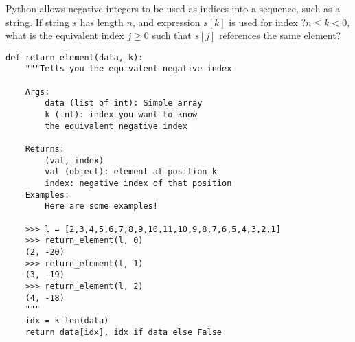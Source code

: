  \label{sssec:ex1_8}

Python allows negative integers to be used as indices into a sequence, such as a string. If string $s$ has length $n$, and expression $s[k]$ is used for index $?n\leq k<0$, what is the equivalent index $j\geq 0$ such that $s[j]$ references the same element?

\begin{lstlisting}[title=Exercise R-1.8]
def return_element(data, k):
    """Tells you the equivalent negative index

    Args:
        data (list of int): Simple array
        k (int): index you want to know
        the equivalent negative index

    Returns:
        (val, index)
        val (object): element at position k
        index: negative index of that position
    Examples:
        Here are some examples!

    >>> l = [2,3,4,5,6,7,8,9,10,11,10,9,8,7,6,5,4,3,2,1]
    >>> return_element(l, 0)
    (2, -20)
    >>> return_element(l, 1)
    (3, -19)
    >>> return_element(l, 2)
    (4, -18)
    """
    idx = k-len(data)
    return data[idx], idx if data else False
\end{lstlisting}